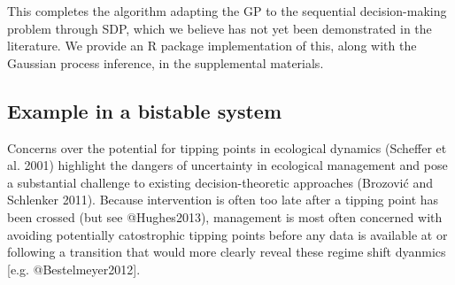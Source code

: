 \documentclass[author-year, review]{elsarticle} %
\newenvironment{Shaded}{}{}
\newcommand{\KeywordTok}[1]{\textcolor[rgb]{0.00,0.44,0.13}{\textbf{{#1}}}}
\newcommand{\DataTypeTok}[1]{\textcolor[rgb]{0.56,0.13,0.00}{{#1}}}
\newcommand{\DecValTok}[1]{\textcolor[rgb]{0.25,0.63,0.44}{{#1}}}
\newcommand{\StringTok}[1]{\textcolor[rgb]{0.25,0.44,0.63}{{#1}}}
\newcommand{\CommentTok}[1]{\textcolor[rgb]{0.38,0.63,0.69}{\textit{{#1}}}}
\newcommand{\NormalTok}[1]{{#1}}
\begin{document}
\begin{Shaded}
\end{Shaded}

This completes the algorithm adapting the GP to the sequential
decision-making problem through SDP, which we believe has not yet been
demonstrated in the literature. We provide an R package implementation
of this, along with the Gaussian process inference, in the supplemental
materials.

\subsection{Example in a bistable system}

Concerns over the potential for tipping points in ecological dynamics
(Scheffer et al. 2001) highlight the dangers of uncertainty in
ecological management and pose a substantial challenge to existing
decision-theoretic approaches (Brozović and Schlenker 2011). Because
intervention is often too late after a tipping point has been crossed
(but see @Hughes2013), management is most often concerned with avoiding
potentially catostrophic tipping points before any data is available at
or following a transition that would more clearly reveal these regime
shift dyanmics {[}e.g. @Bestelmeyer2012{]}.
\end{document}
